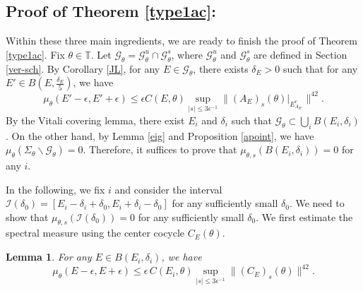 \documentclass[11pt]{amsart}
\newtheorem{lemma}[theorem]{Lemma}
\theoremstyle{remark}
\theoremstyle{definition}
\begin{document}
\subsection{Proof of Theorem \ref{type1ac}:}
Within these three main ingredients, we are ready to finish the proof of Theorem \ref{type1ac}. Fix $\theta \in \mathbb{T}$. Let $\mathcal{G}_\theta = \mathcal{G}_\theta^u \cap \mathcal{G}_\theta^s$, where $\mathcal{G}_\theta^u$ and $\mathcal{G}_\theta^s$ are defined in Section \ref{ver-sch}. By Corollary \ref{JL}, for any $E \in \mathcal{G}_\theta$, there exists $\delta_E > 0$ such that for any $E' \in B(E, \frac{\delta_E}{5})$, we have \begin{equation*}
\mu_\theta(E' - \epsilon, E' + \epsilon) \leq \epsilon C(E, \theta) \sup_{|s| \leq 3 \epsilon^{-1}} \|(A_E)_s(\theta)|_{E_{A_{E'}}^c}\|^{42}.
\end{equation*} By the Vitali covering lemma, there exist $E_i$ and $\delta_i$ such that $\mathcal{G}_\theta \subset \bigcup_i B(E_i, \delta_i)$. On the other hand, by Lemma \ref{eig} and Proposition \ref{apoint}, we have $\mu_{\theta}(\Sigma_{\theta} \backslash \mathcal{G}_\theta) = 0$. Therefore, it suffices to prove that $\mu_{\theta,s}(B(E_i, \delta_i)) = 0$ for any $i$.

In the following, we fix $i$ and consider the interval $\mathcal{I}(\delta_0) = [E_i - \delta_i + \delta_0, E_i + \delta_i - \delta_0]$ for any sufficiently small $\delta_0$. We need to show that $\mu_{\theta,s}(\mathcal{I}(\delta_0)) = 0$ for any sufficiently small $\delta_0$.
We first  estimate the spectral measure using the center cocycle $C_E(\theta).$ 

\begin{lemma}\label{inej}
    For any \( E \in B(E_i, \delta_i) \), we have 
    \[
    \mu_\theta(E - \epsilon, E + \epsilon) \leq \epsilon \, C(E_i, \theta) \sup_{|s| \leq 3 \epsilon^{-1}} \|(C_E)_s(\theta)\|^{42}.
    \]
\end{lemma}
\end{document}
